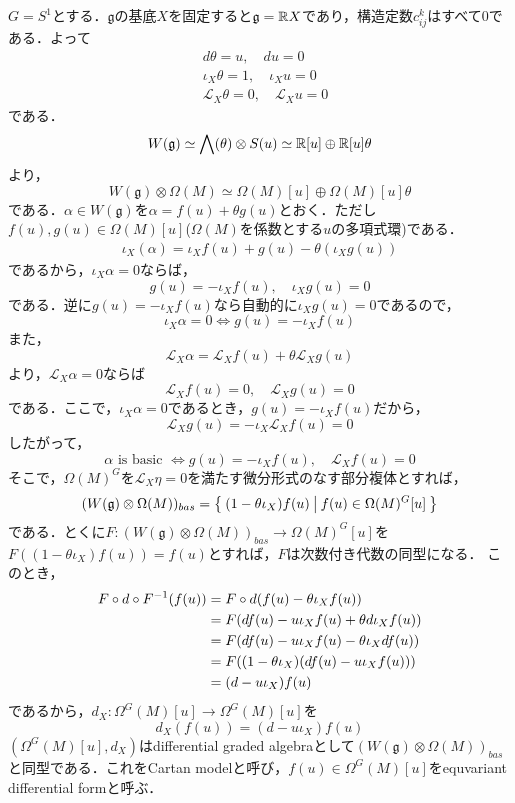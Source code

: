 \begin{eg}
  $G=S^1$とする．$\mathfrak{g}$の基底$X$を固定すると$\mathfrak{g}=\mathbb{R} X$であり，構造定数$c^k_{ij}$はすべて$0$である．よって
  \begin{align*}
    &d\theta = u,\quad du = 0\\
    &\iota_X\theta = 1,\quad\iota_Xu = 0\\
    &\mathcal{L}_X\theta = 0,\quad\mathcal{L}_Xu=0
  \end{align*}
  である．
  \[
  W(\mathfrak{g})\simeq \bigwedge(\theta)\otimes S(u) \simeq \mathbb{R}[u]\oplus \mathbb{R}[u]\theta
  \]
  より，
  \[
  W(\mathfrak{g})\otimes\Omega(M)\simeq \Omega(M)[u]\oplus\Omega(M)[u]\theta
  \]
  である．$\alpha\in W(\mathfrak{g})$を$\alpha = f(u) + \theta g(u)$とおく．ただし$f(u),g(u)\in\Omega(M)[u]$($\Omega(M)$を係数とする$u$の多項式環)である．
  \begin{align*}
    \iota_X(\alpha) = \iota_Xf(u) + g(u) - \theta(\iota_Xg(u))
  \end{align*}
  であるから，$\iota_X\alpha = 0$ならば，
  \[
  g(u) = -\iota_Xf(u),\quad \iota_Xg(u) = 0
  \]
  である．逆に$g(u) = -\iota_Xf(u)$なら自動的に$\iota_Xg(u)=0$であるので，
  \[
  \iota_X\alpha = 0\Leftrightarrow g(u) = -\iota_Xf(u)
  \]
  また，
  \[
  \mathcal{L}_X\alpha = \mathcal{L}_Xf(u) + \theta\mathcal{L}_Xg(u)
  \]
  より，$\mathcal{L}_X\alpha = 0$ならば
  \[
  \mathcal{L}_Xf(u) = 0,\quad \mathcal{L}_Xg(u)=0
  \]
  である．ここで，$\iota_X\alpha = 0$であるとき，$g(u) = -\iota_Xf(u)$だから，
  \[
  \mathcal{L}_Xg(u) = -\iota_X\mathcal{L}_Xf(u)=0
  \]
  したがって，
  \[
  \alpha\text{ is basic }\Leftrightarrow g(u) = -\iota_Xf(u),\quad \mathcal{L}_Xf(u) = 0
  \]
  そこで，$\Omega(M)^G$を$\mathcal{L}_X\eta = 0$を満たす微分形式のなす部分複体とすれば，
  \[
  (W(\mathfrak{g})\otimes\Omega(M))_{bas} = \left\{\:(1-\theta\iota_X)f(u)\:\middle|\:f(u)\in\Omega(M)^G[u]\:\right\}
  \]
  である．とくに$F\colon (W(\mathfrak{g})\otimes\Omega(M))_{bas}\rightarrow \Omega(M)^G[u]$を$F((1-\theta\iota_X)f(u)) = f(u)$とすれば，$F$は次数付き代数の同型になる\cite{tu equivariant}．
  このとき，
  \begin{align*}
    F\circ d\circ F^{-1}(f(u))
    &=F\circ d(f(u) - \theta\iota_Xf(u))\\
    &=F(df(u) - u\iota_Xf(u) + \theta d\iota_Xf(u))\\
    &=F(df(u) - u\iota_Xf(u)-\theta\iota_Xdf(u))\\
    &=F((1-\theta\iota_X)(df(u) - u\iota_Xf(u)))\\
    &=(d-u\iota_X)f(u)
  \end{align*}
  であるから，$d_X\colon\Omega^G(M)[u]\rightarrow \Omega^G(M)[u]$を
  \[
  d_X(f(u)) = (d-u\iota_X)f(u)
  \]
  $(\Omega^G(M)[u],d_X)$はdifferential graded algebraとして$(W(\mathfrak{g})\otimes\Omega(M))_{bas}$と同型である．これをCartan modelと呼び，$f(u)\in\Omega^G(M)[u]$をequvariant differential formと呼ぶ．
\end{eg}

